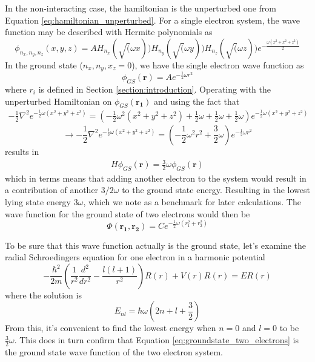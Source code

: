 \documentclass[12pt,english,a4paper]{article}
\begin{document}
In the non-interacting case, the hamiltonian is the unperturbed one from Equation \eqref{eq:hamiltonian_unperturbed}. For a single electron system, the wave function may be described with Hermite polynomials as
\begin{equation}
    \phi_{n_x,n_y,n_z}(x,y,z)=AH_{n_x}(\sqrt(\omega x))H_{n_y}(\sqrt(\omega y))H_{n_z}(\sqrt(\omega z))e^{-\frac{\omega (x^2+x^2+z^2)}{2}}
\end{equation}
In the ground state ($n_x,n_y,x_z=0$), we have the single electron wave function as
\begin{equation}
    \phi_{GS}(\boldsymbol{r})=Ae^{-\frac{1}{2}\omega r^2}
\end{equation}
where $r_i$ is defined in Section \ref{section:introduction}. Operating with the unperturbed Hamiltonian on $\phi_{GS}(\boldsymbol{r_1})$ and using the fact that
\begin{align*}
    -\frac{1}{2}\nabla^2 e^{-\frac{1}{2}\omega (x^2+y^2+z^2)}=\left(-\frac{1}{2}\omega^2\left(x^2+y^2+z^2\right)+\frac{1}{2}\omega+\frac{1}{2}\omega+\frac{1}{2}\omega\right)e^{-\frac{1}{2}\omega (x^2+y^2+z^2)}
\end{align*}
\begin{equation}
    \rightarrow -\frac{1}{2}\nabla^2 e^{-\frac{1}{2}\omega (x^2+y^2+z^2)}=\left(-\frac{1}{2}\omega^2r^2+\frac{3}{2}\omega\right)e^{-\frac{1}{2}\omega r^2}
    \label{eq:partial_derivative}
\end{equation}
results in
\begin{align*}
    H\phi_{GS}(\boldsymbol{r})=\frac{3}{2}\omega\phi_{GS}(\boldsymbol{r})
\end{align*}
which in terms means that adding another electron to the system would result in a contribution of another $3/2\omega$ to the ground state energy. Resulting in the lowest lying state energy $3\omega$, which we note as a benchmark for later calculations. The wave function for the ground state of two electrons would then be
\begin{equation}
    \Phi(\boldsymbol{r_1},\boldsymbol{r_2})=Ce^{-\frac{1}{2}\omega(r_1^2+r_2^2)}
    \label{eq:groundstate_two_electrons}
\end{equation}

To be sure that this wave function actually is the ground state, let's examine the radial Schroedingers equation for one electron in a harmonic potential
\begin{equation}
    -\frac{\hbar^2}{2m}\left(\frac{1}{r^2}\frac{d^2}{dr^2}-\frac{l\left(l+1\right)}{r^2}\right)R(r)+V(r)R(r)=ER(r)
    \label{eq:schroedinger_ho_pot}
\end{equation}
where the solution is
\begin{equation}
    E_{nl}=\hbar\omega\left(2n+l+\frac{3}{2}\right)
\end{equation}
From this, it's convenient to find the lowest energy when $n=0$ and $l=0$ to be $\frac{3}{2}\omega$. This does in turn confirm that Equation \eqref{eq:groundstate_two_electrons} is the ground state wave function of the two electron system.
\end{document}
